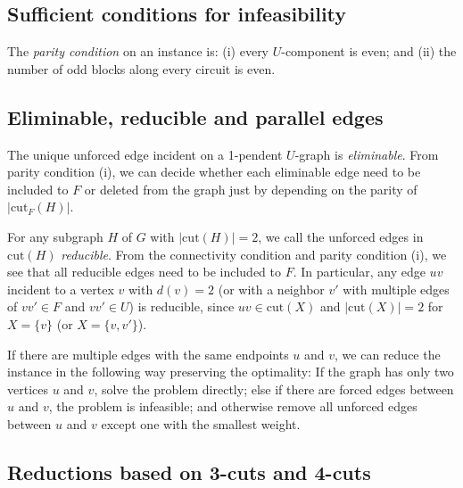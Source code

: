 \documentclass[runningheads]{llncs}
\begin{document}
\subsection{Sufficient conditions for infeasibility}
The {\em parity condition} on an instance is:
(i)  every $U$-component is even; and
(ii)  the number of odd blocks along every circuit is even.


\subsection{Eliminable, reducible and parallel edges}
The unique unforced edge incident on a 1-pendent $U$-graph is \emph{eliminable}.
From parity condition (i), we can decide whether each eliminable edge need to be included to $F$ or deleted from the graph
just by depending on the parity of $|\mathrm{cut}_F(H)|$.


For any subgraph $H$ of $G$ with $|\mathrm{cut}(H)|=2$,
we call the unforced edges in $\mathrm{cut}(H)$ {\em reducible}.
From the connectivity condition and parity condition (i),
we see that all reducible edges need to be included to $F$.
In particular, any edge $uv$ incident to a vertex $v$ with $d(v)=2$
(or with a neighbor $v'$ with multiple edges
of $vv'\in F$ and $vv'\in U$) is reducible,
since $uv\in \mathrm{cut}(X)$ and $|\mathrm{cut}(X)|=2$
 for $X=\{v\}$ (or $X=\{v,v'\}$).


If there are multiple edges with the same endpoints $u$ and $v$, we can reduce the instance in the following way
 preserving the optimality:
 If the graph has only two vertices $u$ and $v$, solve the problem directly; else if there are forced edges between $u$ and $v$, the problem is infeasible; and otherwise remove all unforced edges between $u$ and $v$ except one with the smallest weight.


\subsection{Reductions based on 3-cuts and 4-cuts}
\end{document}
